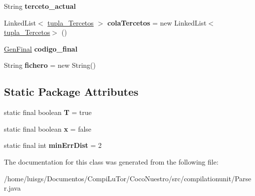 \begin{DoxyCompactItemize}
\item 
\hypertarget{classcompilationunit_1_1_parser_a15bda9adee32201c2d36be6b98ef9ac5}{
String {\bfseries terceto\_\-actual}}
\label{classcompilationunit_1_1_parser_a15bda9adee32201c2d36be6b98ef9ac5}

\item 
\hypertarget{classcompilationunit_1_1_parser_a009394b966551fc88ac8e2d4f7d9cd66}{
LinkedList$<$ \hyperlink{classcompilationunit_1_1tupla___tercetos}{tupla\_\-Tercetos} $>$ {\bfseries colaTercetos} = new LinkedList$<$\hyperlink{classcompilationunit_1_1tupla___tercetos}{tupla\_\-Tercetos}$>$ ()}
\label{classcompilationunit_1_1_parser_a009394b966551fc88ac8e2d4f7d9cd66}

\item 
\hypertarget{classcompilationunit_1_1_parser_a6f7e33c22634bf7fd767c3861893bedf}{
\hyperlink{classcompilationunit_1_1_gen_final}{GenFinal} {\bfseries codigo\_\-final}}
\label{classcompilationunit_1_1_parser_a6f7e33c22634bf7fd767c3861893bedf}

\item 
\hypertarget{classcompilationunit_1_1_parser_ab7b3eb72c2b51d0e1e5ec49101226a19}{
String {\bfseries fichero} = new String()}
\label{classcompilationunit_1_1_parser_ab7b3eb72c2b51d0e1e5ec49101226a19}

\end{DoxyCompactItemize}
\subsection*{Static Package Attributes}
\begin{DoxyCompactItemize}
\item 
\hypertarget{classcompilationunit_1_1_parser_ad235a9ba5f6a81ed5ea5a93ddc27ef53}{
static final boolean {\bfseries T} = true}
\label{classcompilationunit_1_1_parser_ad235a9ba5f6a81ed5ea5a93ddc27ef53}

\item 
\hypertarget{classcompilationunit_1_1_parser_aac4f7f979545e5df81bffbe51a18e461}{
static final boolean {\bfseries x} = false}
\label{classcompilationunit_1_1_parser_aac4f7f979545e5df81bffbe51a18e461}

\item 
\hypertarget{classcompilationunit_1_1_parser_a163d3b5b7422f264e249f5c844d1891e}{
static final int {\bfseries minErrDist} = 2}
\label{classcompilationunit_1_1_parser_a163d3b5b7422f264e249f5c844d1891e}

\end{DoxyCompactItemize}


The documentation for this class was generated from the following file:\begin{DoxyCompactItemize}
\item 
/home/luisgs/Documentos/CompiLuTor/CocoNuestro/src/compilationunit/Parser.java\end{DoxyCompactItemize}
